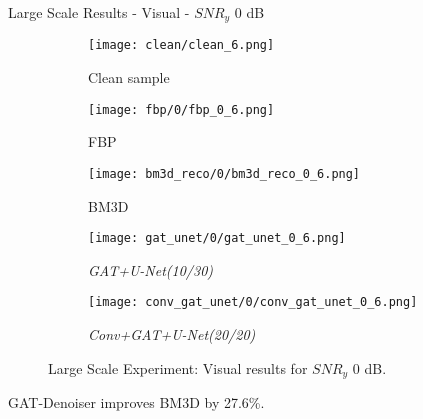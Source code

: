 \begin{frame}{Large Scale Results - Visual - $SNR_y$ 0 dB}
\begin{figure}
    \captionsetup[subfigure]{justification=centering}
    \centering
    \begin{subfigure}[t]{0.18\textwidth}
      \texttt{[image: clean/clean\_6.png]}
      \caption{Clean sample}
    \end{subfigure} \hfill
    \begin{subfigure}[t]{0.18\textwidth}
      \texttt{[image: fbp/0/fbp\_0\_6.png]}
      \caption{FBP}
    \end{subfigure} \hfill
    \begin{subfigure}[t]{0.18\textwidth}
      \texttt{[image: bm3d\_reco/0/bm3d\_reco\_0\_6.png]}
      \caption{BM3D}
    \end{subfigure} \hfill
    \begin{subfigure}[t]{0.18\textwidth}
      \texttt{[image: gat\_unet/0/gat\_unet\_0\_6.png]}
      \caption{\textit{GAT+U-Net(10/30)}}
    \end{subfigure} \hfill
    \begin{subfigure}[t]{0.18\textwidth}
      \texttt{[image: conv\_gat\_unet/0/conv\_gat\_unet\_0\_6.png]}
      \caption{\textit{Conv+GAT+U-Net(20/20)}}
    \end{subfigure} \hfill
    \caption{Large Scale Experiment: Visual results for $SNR_y$ 0 dB.}
  \end{figure}
  

  \begin{tcolorbox}[colback=red!5!white,hide=<1>, alert=<2>, colframe=red!75!black]
    GAT-Denoiser improves BM3D by 27.6\%.
    \end{tcolorbox}
    
\end{frame}


